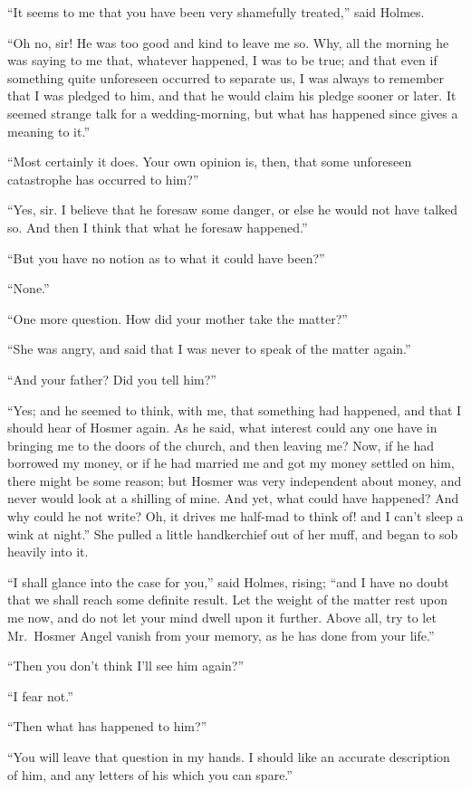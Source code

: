 “It seems to me that you have been very shamefully treated,”
said Holmes.

“Oh no, sir! He was too good and kind to leave me so.
Why, all the morning he was saying to me that, whatever
happened, I was to be true; and that even if something quite
unforeseen occurred to separate us, I was always to remember
that I was pledged to him, and that he would claim his pledge
sooner or later. It seemed strange talk for a wedding-morning,
but what has happened since gives a meaning to it.”

“Most certainly it does. Your own opinion is, then, that
some unforeseen catastrophe has occurred to him?”

“Yes, sir. I believe that he foresaw some danger, or else he
would not have talked so. And then I think that what he
foresaw happened.”

“But you have no notion as to what it could have been?”

“None.”

“One more question. How did your mother take the
matter?”

“She was angry, and said that I was never to speak of the
matter again.”

“And your father? Did you tell him?”

“Yes; and he seemed to think, with me, that something had
happened, and that I should hear of Hosmer again. As he
said, what interest could any one have in bringing me to the
doors of the church, and then leaving me? Now, if he had
borrowed my money, or if he had married me and got my money
settled on him, there might be some reason; but Hosmer
was very independent about money, and never would look at
a shilling of mine. And yet, what could have happened? And
why could he not write? Oh, it drives me half-mad to think
of! and I can’t sleep a wink at night.” She pulled a little
handkerchief out of her muff, and began to sob heavily into it.

“I shall glance into the case for you,” said Holmes, rising;
“and I have no doubt that we shall reach some definite result.
Let the weight of the matter rest upon me now, and do
not let your mind dwell upon it further. Above all, try to let
Mr.~Hosmer Angel vanish from your memory, as he has done
from your life.”

“Then you don’t think I’ll see him again?”

“I fear not.”

“Then what has happened to him?”

“You will leave that question in my hands. I should like
an accurate description of him, and any letters of his which
you can spare.”

